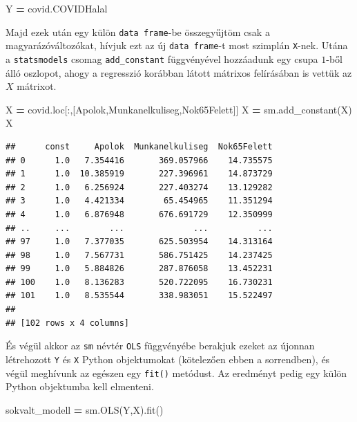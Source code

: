 \documentclass[
]{book}
\newenvironment{Shaded}{\begin{snugshade}}{\end{snugshade}}
\newcommand{\NormalTok}[1]{#1}
\newcommand{\OperatorTok}[1]{\textcolor[rgb]{0.81,0.36,0.00}{\textbf{#1}}}
\newcommand{\StringTok}[1]{\textcolor[rgb]{0.31,0.60,0.02}{#1}}
\begin{document}
\begin{Shaded}
\begin{Highlighting}[]
\NormalTok{Y }\OperatorTok{=}\NormalTok{ covid.COVIDHalal}
\end{Highlighting}
\end{Shaded}

Majd ezek után egy külön \texttt{data\ frame}-be összegyűjtöm csak a magyarázóváltozókat, hívjuk ezt az új \texttt{data\ frame}-t most szimplán \texttt{X}-nek. Utána a \texttt{statsmodels} csomag \texttt{add\_constant} függvényével hozzáadunk egy csupa \(1\)-ből álló oszlopot, ahogy a regresszió korábban látott mátrixos felírásában is vettük az \(X\) mátrixot.

\begin{Shaded}
\begin{Highlighting}[]
\NormalTok{X }\OperatorTok{=}\NormalTok{ covid.loc[:,[}\StringTok{\textquotesingle{}Apolok\textquotesingle{}}\NormalTok{,}\StringTok{\textquotesingle{}Munkanelkuliseg\textquotesingle{}}\NormalTok{,}\StringTok{\textquotesingle{}Nok65Felett\textquotesingle{}}\NormalTok{]]}
\NormalTok{X }\OperatorTok{=}\NormalTok{ sm.add\_constant(X)}
\NormalTok{X}
\end{Highlighting}
\end{Shaded}

\begin{verbatim}
##      const     Apolok  Munkanelkuliseg  Nok65Felett
## 0      1.0   7.354416       369.057966    14.735575
## 1      1.0  10.385919       227.396961    14.873729
## 2      1.0   6.256924       227.403274    13.129282
## 3      1.0   4.421334        65.454965    11.351294
## 4      1.0   6.876948       676.691729    12.350999
## ..     ...        ...              ...          ...
## 97     1.0   7.377035       625.503954    14.313164
## 98     1.0   7.567731       586.751425    14.237425
## 99     1.0   5.884826       287.876058    13.452231
## 100    1.0   8.136283       520.722095    16.730231
## 101    1.0   8.535544       338.983051    15.522497
## 
## [102 rows x 4 columns]
\end{verbatim}

És végül akkor az \texttt{sm} névtér \texttt{OLS} függvényébe berakjuk ezeket az újonnan létrehozott \texttt{Y} és \texttt{X} Python objektumokat (kötelezően ebben a sorrendben), és végül meghívunk az egészen egy \texttt{fit()} metódust. Az eredményt pedig egy külön Python objektumba kell elmenteni.

\begin{Shaded}
\begin{Highlighting}[]
\NormalTok{sokvalt\_modell }\OperatorTok{=}\NormalTok{ sm.OLS(Y,X).fit()}
\end{Highlighting}
\end{Shaded}
\end{document}
